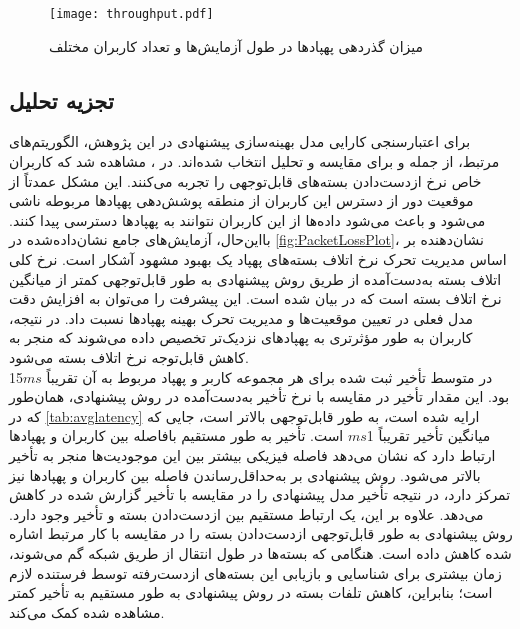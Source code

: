 \begin{itemize}
	
\begin{figure}
\texttt{[image: throughput.pdf]}
\caption[%
میزان گذردهی پهپاد‌ها در طول آزمایش‌ها و تعداد کاربران مختلف]{میزان گذردهی پهپاد‌ها در طول آزمایش‌ها و تعداد کاربران مختلف}
\label{fig:Throughput}
\end{figure}
\end{itemize}
\subsection{تجزیه تحلیل}\label{subsection:referencecompare}
برای اعتبارسنجی کارایی مدل بهینه‌سازی پیشنهادی در این پژوهش، الگوریتم‌های مرتبط، از جمله \cite{Pasandideh2023} و \cite{8892933} برای مقایسه و تحلیل انتخاب شده‌اند. در \cite{Pasandideh2023}، مشاهده شد که کاربران خاص نرخ ازدست‌دادن بسته‌های قابل‌توجهی را تجربه می‌کنند. این مشکل عمدتاً از موقعیت دور از دسترس این کاربران از منطقه پوشش‌دهی پهپادها مربوطه ناشی می‌شود و باعث می‌شود داده‌ها از این کاربران نتوانند به پهپادها دسترسی پیدا کنند. بااین‌حال، آزمایش‌های جامع نشان‌داده‌شده در \autoref{fig:PacketLossPlot}، نشان‌دهنده بر اساس مدیریت تحرک نرخ اتلاف بسته‌های پهپاد یک بهبود مشهود آشکار است. نرخ کلی اتلاف بسته به‌دست‌آمده از طریق روش پیشنهادی به طور قابل‌توجهی کمتر از میانگین نرخ اتلاف بسته است که در \cite{Pasandideh2023} بیان شده است. این پیشرفت را می‌توان به افزایش دقت مدل فعلی در تعیین موقعیت‌ها و مدیریت تحرک بهینه پهپادها نسبت داد. در نتیجه، کاربران به طور مؤثرتری به پهپادهای نزدیک‌تر تخصیص داده می‌شوند که منجر به کاهش قابل‌توجه نرخ اتلاف بسته می‌شود.
\\
در \cite{Pasandideh2023} متوسط تأخیر ثبت شده برای هر مجموعه کاربر و پهپاد مربوط به آن تقریباً $ms$15 بود. این مقدار تأخیر در مقایسه با نرخ تأخیر به‌دست‌آمده در روش پیشنهادی، همان‌طور که در \autoref{tab:avglatency} ارایه شده است، به طور قابل‌توجهی بالاتر است، جایی که میانگین تأخیر تقریباً 1$ms$ است. تأخیر به طور مستقیم بافاصله بین کاربران و پهپادها ارتباط دارد که نشان می‌دهد فاصله فیزیکی بیشتر بین این موجودیت‌ها منجر به تأخیر بالاتر می‌شود. روش پیشنهادی بر به‌حداقل‌رساندن فاصله بین کاربران و پهپادها نیز تمرکز دارد، در نتیجه تأخیر مدل پیشنهادی را در مقایسه با تأخیر گزارش شده در \cite{Pasandideh2023} کاهش می‌دهد. علاوه بر این، یک ارتباط مستقیم بین ازدست‌دادن بسته و تأخیر وجود دارد. روش پیشنهادی به طور قابل‌توجهی ازدست‌دادن بسته را در مقایسه با کار مرتبط اشاره شده کاهش داده است. هنگامی که بسته‌ها در طول انتقال از طریق شبکه گم می‌شوند، زمان بیشتری برای شناسایی و بازیابی این بسته‌های ازدست‌رفته توسط فرستنده لازم است؛ بنابراین، کاهش تلفات بسته در روش پیشنهادی به طور مستقیم به تأخیر کمتر مشاهده شده کمک می‌کند.
